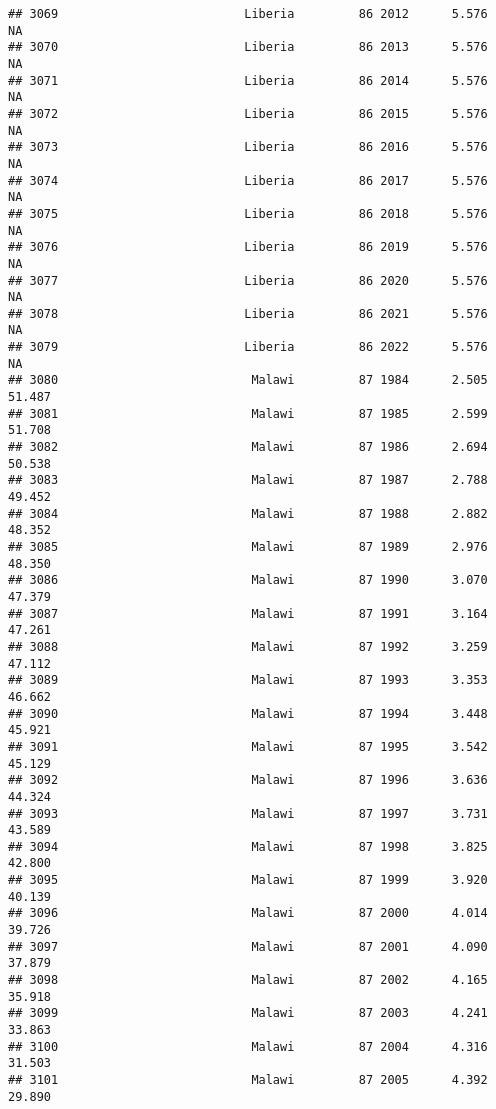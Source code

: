 \documentclass[
]{article}
\begin{document}
\begin{verbatim}
## 3069                          Liberia         86 2012      5.576         NA
## 3070                          Liberia         86 2013      5.576         NA
## 3071                          Liberia         86 2014      5.576         NA
## 3072                          Liberia         86 2015      5.576         NA
## 3073                          Liberia         86 2016      5.576         NA
## 3074                          Liberia         86 2017      5.576         NA
## 3075                          Liberia         86 2018      5.576         NA
## 3076                          Liberia         86 2019      5.576         NA
## 3077                          Liberia         86 2020      5.576         NA
## 3078                          Liberia         86 2021      5.576         NA
## 3079                          Liberia         86 2022      5.576         NA
## 3080                           Malawi         87 1984      2.505     51.487
## 3081                           Malawi         87 1985      2.599     51.708
## 3082                           Malawi         87 1986      2.694     50.538
## 3083                           Malawi         87 1987      2.788     49.452
## 3084                           Malawi         87 1988      2.882     48.352
## 3085                           Malawi         87 1989      2.976     48.350
## 3086                           Malawi         87 1990      3.070     47.379
## 3087                           Malawi         87 1991      3.164     47.261
## 3088                           Malawi         87 1992      3.259     47.112
## 3089                           Malawi         87 1993      3.353     46.662
## 3090                           Malawi         87 1994      3.448     45.921
## 3091                           Malawi         87 1995      3.542     45.129
## 3092                           Malawi         87 1996      3.636     44.324
## 3093                           Malawi         87 1997      3.731     43.589
## 3094                           Malawi         87 1998      3.825     42.800
## 3095                           Malawi         87 1999      3.920     40.139
## 3096                           Malawi         87 2000      4.014     39.726
## 3097                           Malawi         87 2001      4.090     37.879
## 3098                           Malawi         87 2002      4.165     35.918
## 3099                           Malawi         87 2003      4.241     33.863
## 3100                           Malawi         87 2004      4.316     31.503
## 3101                           Malawi         87 2005      4.392     29.890

\end{verbatim}
\end{document}
